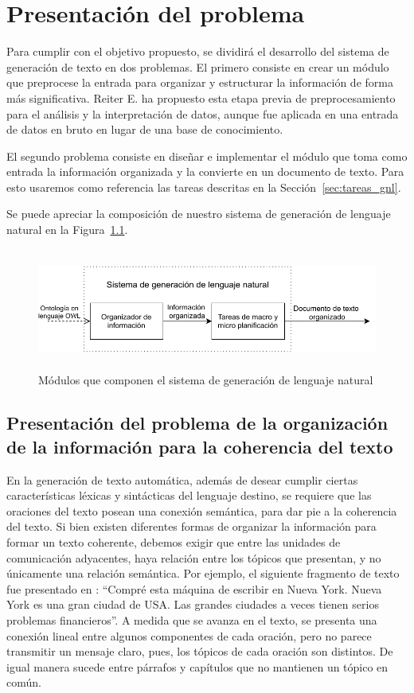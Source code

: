 \chapter{Presentación del problema}

Para cumplir con el objetivo propuesto, se dividirá el desarrollo del sistema de generación de texto en dos problemas. El primero consiste en crear un módulo que preprocese la entrada para organizar y estructurar la información de forma más significativa. Reiter E. ha propuesto esta etapa previa de preprocesamiento~\cite{reiter2007architecture} para el análisis y la interpretación de datos, aunque fue aplicada en una entrada de datos en bruto en lugar de una base de conocimiento.

El segundo problema consiste en diseñar e implementar el módulo que toma como entrada la información organizada y la convierte en un documento de texto. Para esto usaremos como referencia las tareas descritas en la Sección~\ref{sec:tareas_gnl}.

Se puede apreciar la composición de nuestro sistema de generación de lenguaje natural en la Figura~\ref{fig:modulos_sgln}.

\begin{figure}
    \centering
    \includegraphics[width=12cm, height=4cm]{img/presentacion_problema/modulos_sgln.pdf}
    \caption{Módulos que componen el sistema de generación de lenguaje natural}
    \label{fig:modulos_sgln}
\end{figure}

\section{Presentación del problema de la organización de la información para la coherencia del texto}
\label{sec:problema_coherencia-texto}
 En la generación de texto automática, además de desear cumplir ciertas características léxicas y sintácticas del lenguaje destino, se requiere que las oraciones del texto posean una conexión semántica, para dar pie a la coherencia del texto. 
Si bien existen diferentes formas de organizar la información para formar un texto coherente, debemos exigir que entre las unidades de comunicación adyacentes, haya relación entre los tópicos que presentan, y no únicamente una relación semántica. Por ejemplo, el siguiente fragmento de texto fue presentado en \cite{van1983ciencia}:
``Compré esta máquina de escribir en Nueva York. Nueva York es una gran ciudad de USA. Las grandes ciudades a veces tienen serios problemas financieros''. A medida que se avanza en el texto, se presenta una conexión lineal entre algunos componentes de cada oración, pero no parece transmitir un mensaje claro, pues, los tópicos de cada oración son distintos. De igual manera sucede entre párrafos y capítulos que no mantienen un tópico en común. 

